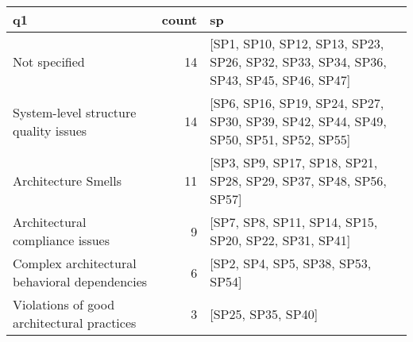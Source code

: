 \begin{tabular}{lrl}
\toprule
                                            q1 &  count &                                                                                   sp \\
\midrule
                                 Not specified &     14 &  [SP1, SP10, SP12, SP13, SP23, SP26, SP32, SP33, SP34, SP36, SP43, SP45, SP46, SP47] \\
         System-level structure quality issues &     14 &  [SP6, SP16, SP19, SP24, SP27, SP30, SP39, SP42, SP44, SP49, SP50, SP51, SP52, SP55] \\
                           Architecture Smells &     11 &                     [SP3, SP9, SP17, SP18, SP21, SP28, SP29, SP37, SP48, SP56, SP57] \\
               Architectural compliance issues &      9 &                                 [SP7, SP8, SP11, SP14, SP15, SP20, SP22, SP31, SP41] \\
 Complex architectural behavioral dependencies &      6 &                                                    [SP2, SP4, SP5, SP38, SP53, SP54] \\
    Violations of good architectural practices &      3 &                                                                   [SP25, SP35, SP40] \\
\bottomrule
\end{tabular}
